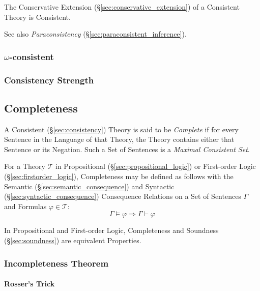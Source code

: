 The Conservative Extension (\S\ref{sec:conservative_extension}) of a
Consistent Theory is Consistent.

See also \emph{Paraconsistency} (\S\ref{sec:paraconsistent_inference}).



\subsubsection{$\omega$-consistent}\label{sec:omega_consistent}

\subsubsection{Consistency Strength}\label{sec:consistency_strength}



\subsection{Completeness}\label{sec:completeness}

A Consistent (\S\ref{sec:consistency}) Theory is said to be
\emph{Complete} if for every Sentence in the Language of that Theory,
the Theory contains either that Sentence or its Negation. Such a Set
of Sentences is a \emph{Maximal Consistent Set}.

For a Theory $\mathcal{T}$ in Propositional
(\S\ref{sec:propositional_logic}) or First-order Logic
(\S\ref{sec:firstorder_logic}), Completeness may be defined as follows
with the Semantic (\S\ref{sec:semantic_consequence}) and Syntactic
(\S\ref{sec:syntactic_consequence}) Consequence Relations on a Set of
Sentences $\Gamma$ and Formulas $\varphi \in \mathcal{T}$:
\[
  \Gamma \vDash \varphi \Rightarrow \Gamma \vdash \varphi
\]

In Propositional and First-order Logic, Completeness and Soundness
(\S\ref{sec:soundness}) are equivalent Properties.



\subsubsection{Incompleteness Theorem}\label{sec:incompleteness_theorem}

\paragraph{Rosser's Trick}\label{sec:rossers_trick}\hfill



